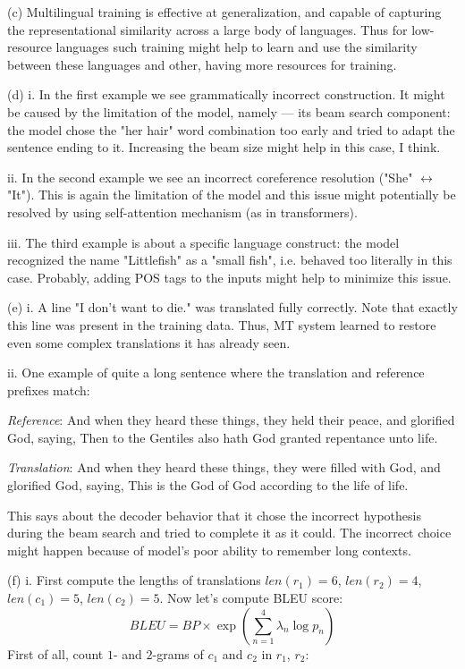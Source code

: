 \documentclass[12pt]{article}
\begin{document}
\noindent (c) Multilingual training is effective at generalization, and capable of capturing the representational similarity across a large body of languages. Thus for low-resource languages such training might help to learn and use the similarity between these languages and other, having more resources for training.
\smallskip

\noindent (d) i. In the first example we see grammatically incorrect construction. It might be caused by the limitation of the model, namely --- its beam search component: the model chose the "her hair" word combination too early and tried to adapt the sentence ending to it. Increasing the beam size might help in this case, I think.

ii. In the second example we see an incorrect coreference resolution ("She" $\leftrightarrow$ "It"). This is again the limitation of the model and this issue might potentially be resolved by using self-attention mechanism (as in transformers).

iii. The third example is about a specific language construct: the model recognized the name "Littlefish" as a "small fish", i.e. behaved too literally in this case. Probably, adding POS tags to the inputs might help to minimize this issue.
\smallskip

\noindent (e) i. A line "I don’t want to die." was translated fully correctly. Note that exactly this line was present in the training data. Thus, MT system learned to restore even some complex translations it has already seen.

ii. One example of quite a long sentence where the translation and reference prefixes match:

\textit{Reference}: And when they heard these things, they held their peace, and glorified God, saying, Then to the Gentiles also hath God granted repentance unto life.

\textit{Translation}: And when they heard these things, they were filled with God, and glorified God, saying, This is the God of God according to the life of life.

This says about the decoder behavior that it chose the incorrect hypothesis during the beam search and tried to complete it as it could. The incorrect choice might happen because of model's poor ability to remember long contexts.
\smallskip

\noindent (f) i. First compute the lengths of translations $len(r_1) = 6$, $len(r_2) = 4$, $len(c_1) = 5$, $len(c_2) = 5$. Now let's compute BLEU score:
$$
BLEU = BP \times \exp\left(\sum_{n=1}^4 \lambda_n \log p_n\right)
$$
First of all, count $1$- and $2$-grams of $c_1$ and $c_2$ in $r_1$, $r_2$:
\end{document}
